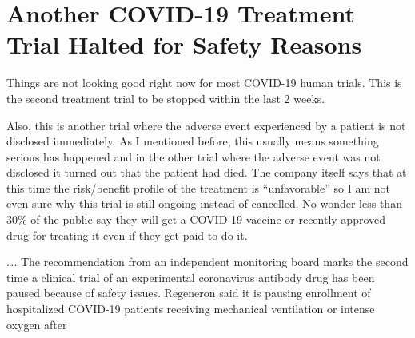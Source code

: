\chapter{Another COVID-19 Treatment Trial Halted for Safety Reasons}

\begin{refsection}

Things are not looking good right now for most COVID-19 human trials. This is the second treatment trial to be stopped within the last 2 weeks.\textsuperscript{\cite{urlc75d148f}}

Also, this is another trial where the adverse event experienced by a patient is not disclosed immediately. As I mentioned before, this usually means something serious has happened and in the other trial where the adverse event was not disclosed it turned out that the patient had died. The company itself says that at this time the risk/benefit profile of the treatment is \enquote{unfavorable} so I am not even sure why this trial is still ongoing instead of cancelled. No wonder less than 30\% of the public say they will get a COVID-19 vaccine or recently approved drug for treating it even if they get paid to do it.

\begin{tcolorbox}[quote]

\dots{}. The recommendation from an independent monitoring board marks the second time a clinical trial of an experimental coronavirus antibody drug has been paused because of safety issues. Regeneron said it is pausing enrollment of hospitalized COVID-19 patients receiving mechanical ventilation or intense oxygen after \textsuperscript{\cite{url7f634c20}}

\end{tcolorbox}

\printbibliography[heading=subbibliography]

\end{refsection}
